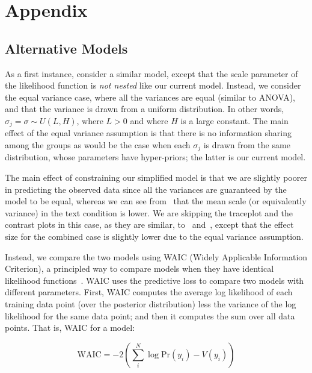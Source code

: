 \section{Appendix}
\subsection{Alternative Models}
\label{sub:Alternative Models}

As a first instance, consider a similar model, except that the scale parameter of the likelihood function is \textit{not nested} like our current model. Instead, we consider the equal variance case, where all the variances are equal (similar to ANOVA), and that the variance is drawn from a uniform distribution. In other words, $\sigma_j = \sigma \sim U(L, H)$, where $L>0$ and where $H$ is a large constant. The main effect of the equal variance assumption is that there is no information sharing among the groups as would be the case when each $\sigma_j$ is drawn from the same distribution, whose parameters have hyper-priors; the latter is our current model.

The main effect of constraining our simplified model is that we are slightly poorer in predicting the observed data since all the variances are guaranteed by the model to be equal, whereas we can see from~ that the mean scale (or equivalently variance) in the text condition is lower. We are skipping the traceplot and the contrast plots in this case, as they are similar, to~ and~, except that the effect size for the combined case is slightly lower due to the equal variance assumption. 

Instead, we compare the two models using WAIC (Widely Applicable Information Criterion), a principled way to compare models when they have identical likelihood functions~\parencite{Gelman2014a}. WAIC uses the predictive loss to compare two models with different parameters. First, WAIC computes the average log likelihood of each training data point (over the posterior distribution) less the variance of the log likelihood for the same data point; and then it computes the sum over all data points. That is, WAIC for a model: 

\begin{equation*}
    \mathrm{WAIC} = -2 \left (\sum_i^N \log \mathrm{Pr}(y_i) - V(y_i) \right) 
\end{equation*}

